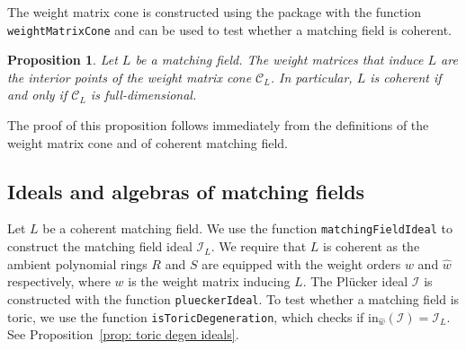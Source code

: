 \documentclass[11pt]{article}
\newcommand{\MC}{\mathcal C}
\newcommand{\MI}{\mathcal I}
\newcommand{\init}{\text{in}}
\theoremstyle{plain}
\newtheorem{proposition}[theorem]{Proposition}
\theoremstyle{definition}
\theoremstyle{remark}
\begin{document}
The weight matrix cone is constructed using the package with the function \texttt{weightMatrixCone} and can be used to test whether a matching field is coherent. 

\begin{proposition} \label{prop: coherent iff WMC full dim}
    Let $L$ be a matching field. The weight matrices that induce $L$ are the interior points of the weight matrix cone $\MC_L$. In particular, $L$ is coherent if and only if $\MC_L$ is full-dimensional.
\end{proposition}

The proof of this proposition follows immediately from the definitions of the weight matrix cone and of coherent matching field.



\subsection{Ideals and algebras of matching fields}\label{sec: ideals and rings of MFs}








Let $L$ be a coherent matching field. We use the function \texttt{matchingFieldIdeal} to construct the matching field ideal $\MI_L$. We require that $L$ is coherent as the ambient polynomial rings $R$ and $S$ are equipped with the weight orders $w$ and $\widehat w$ respectively, where $w$ is the weight matrix inducing $L$. The Pl\"ucker ideal $\MI$ is constructed with the function \texttt{plueckerIdeal}. To test whether a matching field is toric, we use the function \texttt{isToricDegeneration}, which checks if $\init_{\widehat w}(\MI) = \MI_L$. See Proposition~\ref{prop: toric degen ideals}.
\end{document}
